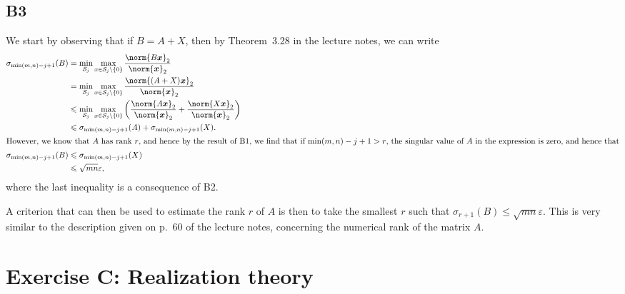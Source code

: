 \documentclass[11pt]{article}
\newcommand{\snorm}[1]{\norm{#1}_2} %
\begin{document}
\subsection*{B3}
We start by observing that if \(B = A + X\), then by Theorem~3.28 in the lecture notes, we can write
\begin{align*}
\sigma_{\min(m, n) - j + 1}(B) &= \min_{\mathcal{S}_j} \max_{x \in \mathcal{S}_j \setminus \{0\}} \frac{\snorm{B\bm{x}}}{\snorm{\bm{x}}}\\
&= \min_{\mathcal{S}_j} \max_{x \in \mathcal{S}_j \setminus \{0\}} \frac{\snorm{(A + X)\bm{x}}}{\snorm{\bm{x}}}\\
&\leqslant\min_{\mathcal{S}_j} \max_{x \in \mathcal{S}_j \setminus \{0\}} \left(\frac{\snorm{A\bm{x}}}{\snorm{\bm{x}}} + \frac{\snorm{X\bm{x}}}{\snorm{\bm{x}}}\right)\\
&\leqslant \sigma_{\min(m, n) - j + 1}(A) + \sigma_{\min(m, n) - j + 1}(X).\\
\intertext{However, we know that \(A\) has rank \(r\), and hence by the result of B1, we find that if \(\min(m, n) - j + 1 > r\), the singular value of \(A\) in the expression is zero, and hence that}
\sigma_{\min(m, n) - j + 1}(B) &\leqslant \sigma_{\min(m, n) - j + 1}(X)\\
&\leqslant \sqrt{mn} \varepsilon,
\end{align*}
where the last inequality is a consequence of B2.

A criterion that can then be used to estimate the rank \(r\) of \(A\) is then to take the smallest \(r\) such that \(\sigma_{r + 1}(B) \leqslant \sqrt{mn} \varepsilon\).
This is very similar to the description given on p.~60 of the lecture notes, concerning the numerical rank of the matrix \(A\). 

\section*{Exercise C: Realization theory}
\end{document}
